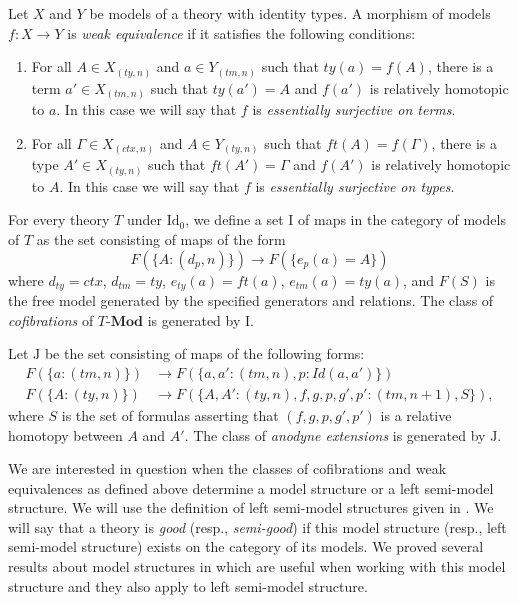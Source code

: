 \documentclass[reqno]{amsart}
\theoremstyle{definition}
\theoremstyle{remark}
\newcommand{\cat}[1]{\mathbf{#1}}
\newcommand{\Mod}[1]{#1\text{-}\cat{Mod}}
\newcommand{\IdT}{\mathrm{Id}}
\newcommand{\Id}{\mathit{Id}}
\newcommand{\ft}{\mathit{ft}}
\newcommand{\ty}{\mathit{ty}}
\newcommand{\ctx}{\mathit{ctx}}
\newcommand{\tm}{\mathit{tm}}
\newcommand{\I}{\mathrm{I}}
\newcommand{\J}{\mathrm{J}}
\numberwithin{figure}{section}
\begin{document}
Let $X$ and $Y$ be models of a theory with identity types.
A morphism of models $f : X \to Y$ is \emph{weak equivalence} if it satisfies the following conditions:
\begin{enumerate}
\item For all $A \in X_{(\ty,n)}$ and $a \in Y_{(\tm,n)}$ such that $\ty(a) = f(A)$,
there is a term $a' \in X_{(\tm,n)}$ such that $\ty(a') = A$ and $f(a')$ is relatively homotopic to $a$.
In this case we will say that $f$ is \emph{essentially surjective on terms}.
\item For all $\Gamma \in X_{(\ctx,n)}$ and $A \in Y_{(\ty,n)}$ such that $\ft(A) = f(\Gamma)$,
there is a type $A' \in X_{(\ty,n)}$ such that $\ft(A') = \Gamma$ and $f(A')$ is relatively homotopic to $A$.
In this case we will say that $f$ is \emph{essentially surjective on types}.
\end{enumerate}

For every theory $T$ under $\IdT_0$, we define a set $\I$ of maps in the category of models of $T$ as the set consisting of maps of the form
\[ F(\{ A : (d_p,n) \}) \to F(\{ e_p(a) = A \}) \]
where $d_\ty = \ctx$, $d_\tm = \ty$, $e_\ty(a) = \ft(a)$, $e_\tm(a) = \ty(a)$,
and $F(S)$ is the free model generated by the specified generators and relations.
The class of \emph{cofibrations} of $\Mod{T}$ is generated by $\I$.

Let $\J$ be the set consisting of maps of the following forms:
\begin{align*}
F(\{ a : (\tm,n) \}) & \to F(\{ a, a' : (\tm,n), p : \Id(a,a') \}) \\
F(\{ A : (\ty,n) \}) & \to F(\{ A, A' : (\ty,n), f,g,p,g',p' : (\tm,n+1), S \}),
\end{align*}
where $S$ is the set of formulas asserting that $(f,g,p,g',p')$ is a relative homotopy between $A$ and $A'$.
The class of \emph{anodyne extensions} is generated by $\J$.

We are interested in question when the classes of cofibrations and weak equivalences as defined above determine a model structure or a left semi-model structure.
We will use the definition of left semi-model structures given in \cite[Lemma~6.7]{kap-lum-model}.
We will say that a theory is \emph{good} (resp., \emph{semi-good}) if this model structure (resp., left semi-model structure) exists on the category of its models.
We proved several results about model structures in \cite{f-model-structures} which are useful when working with this model structure and they also apply to left semi-model structure.
\end{document}
